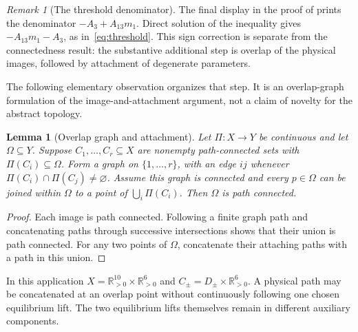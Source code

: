 \documentclass[11pt,a4paper]{article}
\numberwithin{equation}{section}
\newtheorem{lemma}[theorem]{Lemma}
\theoremstyle{remark}\newtheorem{remark}[theorem]{Remark}
\newcommand{\pos}{\mathbb{R}_{>0}}
\newcommand{\Om}{\Omega}
\begin{document}
\begin{remark}[The threshold denominator]
The final display in the proof of \cite[Theorem~4.2]{KW} prints the denominator $-A_3+A_{13}m_1$. Direct solution of the inequality gives $-A_{13}m_1-A_3$, as in~\eqref{eq:threshold}. This sign correction is separate from the connectedness result: the substantive additional step is overlap of the physical images, followed by attachment of degenerate parameters.
\end{remark}

The following elementary observation organizes that step. It is an overlap-graph formulation of the image-and-attachment argument, not a claim of novelty for the abstract topology.

\begin{lemma}[Overlap graph and attachment]\label{lem:graph}
Let $\Pi:X\to Y$ be continuous and let $\Om\subseteq Y$. Suppose $C_1,\ldots,C_r\subseteq X$ are nonempty path-connected sets with $\Pi(C_i)\subseteq\Om$. Form a graph on $\{1,\ldots,r\}$, with an edge $ij$ whenever $\Pi(C_i)\cap\Pi(C_j)\ne\varnothing$. Assume this graph is connected and every $p\in\Om$ can be joined within $\Om$ to a point of $\bigcup_i\Pi(C_i)$. Then $\Om$ is path connected.
\end{lemma}
\begin{proof}
Each image is path connected. Following a finite graph path and concatenating paths through successive intersections shows that their union is path connected. For any two points of $\Om$, concatenate their attaching paths with a path in this union.
\end{proof}

In this application $X=\pos^{10}\times\pos^6$ and $C_\pm=D_\pm\times\pos^6$. A physical path may be concatenated at an overlap point without continuously following one chosen equilibrium lift. The two equilibrium lifts themselves remain in different auxiliary components.
\end{document}
